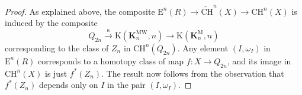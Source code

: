 \documentclass[10pt,a4paper]{amsart}
\newcommand{\CH}{{\mathrm{CH}}}
\newcommand{\CHW}{{\widetilde{\mathrm{CH}}}}
\newcommand{\Er}{\mathrm{E}}
\newcommand{\K}{{{\mathbf K}}}
\newcommand{\KM}{\K^{\mathrm M}}
\newcommand{\KMW}{\K^{\mathrm{MW}}}
\begin{document}
\begin{proof}
As explained above, the composite $\Er^n(R)\to \CHW^n(X)\to \CH^n(X)$ is induced by the composite
\[
Q_{2n}\xrightarrow{\kappa} \mathrm{K}(\KMW_n,n)\to \mathrm{K}(\KM_n,n)
\]
corresponding to the class of $Z_n$ in $\CH^n(Q_{2n})$. Any element $(I,\omega_I)$ in $\Er^n(R)$ corresponds to a homotopy class of map $f\colon X\to Q_{2n}$, and its image in $\CH^n(X)$ is just $f^*(Z_n)$. The result now follows from the observation that $f^*(Z_n)$ depends only on $I$ in the pair $(I,\omega_I)$.
\end{proof}
\end{document}
